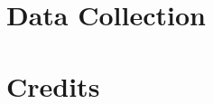\documentclass[a4paper]{article}
\begin{document}
\appendix
\section{Data Collection}

\newpage

\section{Credits}

\newpage








\end{document}
